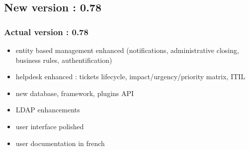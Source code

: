 \documentclass{beamer}
\begin{document}
\subsection{New version : 0.78}
%
\begin{frame}
\frametitle{Actual version : 0.78}
%
\begin{itemize}
%
\item entity based management enhanced (notifications, administrative closing, business rules, authentification)
\item helpdesk enhanced : tickets lifecycle, impact/urgency/priority matrix, ITIL
\item new database, framework, plugins API
\item LDAP enhancements
\item user interface polished
\item user documentation in french
%
\end{itemize}
\end{frame}
%
%
%
%


\end{document}
